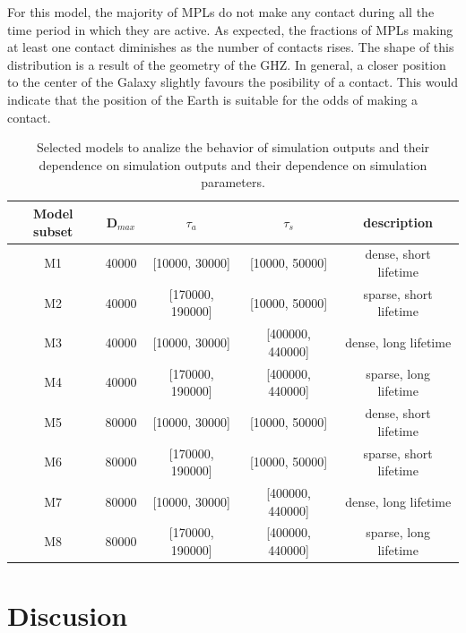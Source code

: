 \documentclass[crop]{CSLB}%
\begin{document}
%
For this model, the majority of MPLs do not make any contact during
all the time period in which they are active.
%
As expected, the fractions of MPLs making at least one contact
diminishes as the number of contacts rises.
%
The shape of this distribution is a result of the geometry of the GHZ.
%
In general, a closer position to the center of the Galaxy slightly
favours the posibility of a contact.
%
This would indicate that the position of the Earth is suitable for the
odds of making a contact.


\setlength{\tabcolsep}{10pt}
\begin{table}
\centering
\begin{tabular}{ccccc}
\hline
Model subset & D$_{max}$ & $\tau_a$ & $\tau_s$ & description  \\
\hline
M1 & 40000 & [10000, 30000]   & [10000, 50000]   &dense, short lifetime\\
M2 & 40000 & [170000, 190000] & [10000, 50000]   &sparse, short lifetime\\
M3 & 40000 & [10000, 30000]   & [400000, 440000] &dense, long lifetime \\
M4 & 40000 & [170000, 190000] & [400000, 440000] &sparse, long lifetime\\
%
M5 & 80000 & [10000, 30000]   & [10000, 50000]   &dense, short lifetime\\
M6 & 80000 & [170000, 190000] & [10000, 50000]   &sparse, short lifetime\\
M7 & 80000 & [10000, 30000]   & [400000, 440000] &dense, long lifetime \\
M8 & 80000 & [170000, 190000] & [400000, 440000] &sparse, long lifetime\\
%
\hline
\end{tabular}
\caption{Selected models to analize the behavior of simulation outputs
   and their dependence on simulation outputs and their dependence on
   simulation parameters.}
\label{T_selected_models}
\end{table}


\section{Discusion}\label{S_discussion}
\end{document}
